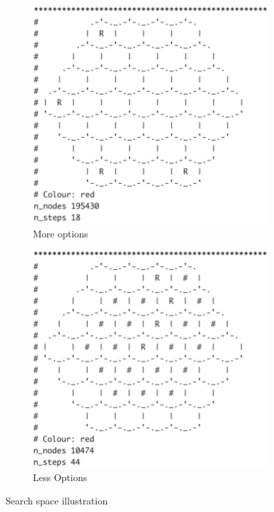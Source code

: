 \documentclass[10.5pt,a4paper]{article}
\begin{document}
        \begin{figure}
    \begin{center}
        \begin{subfigure}[b]{0.2\textwidth}
            \includegraphics[width=\textwidth]{SpaceComplexity1.png}
            \caption{More options}
            \label{fig:more_move}
        \end{subfigure}
        \begin{subfigure}[b]{0.2\textwidth}
            \includegraphics[width=\textwidth]{SpaceComplexity2.png}
            \caption{Less Options}
            \label{fig:less_move}
        \end{subfigure}
    \end{center}
    \vspace{-10pt}
    \caption{Search space illustration}\label{fig:moves}
\end{figure}
\end{document}
